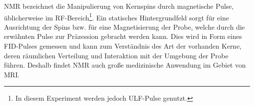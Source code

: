 \documentclass[../main.tex]{subfiles}
\begin{document}
NMR bezeichnet die Manipulierung von Kernspins durch magnetische Pulse, üblicherweise im RF-Bereich\footnote{In diesem Experiment werden jedoch ULF-Pulse genutzt.}. Ein statisches Hintergrundfeld sorgt für eine Ausrichtung der Spins bzw. für eine Magnetisierung der Probe, welche durch die erwähnten Pulse zur Präzession gebracht werden kann. Dies wird in Form eines FID-Pulses gemessen und kann zum Verständnis des Art der vorhanden Kerne, deren räumlichen Verteilung und Interaktion mit der Umgebung der Probe führen. Deshalb findet NMR auch große medizinische Anwendung im Gebiet von MRI.
\end{document}
